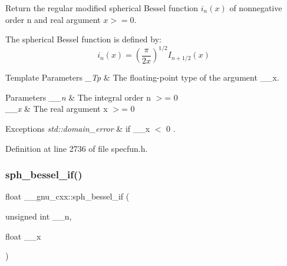 Return the regular modified spherical Bessel function $ i_n(x) $ of nonnegative order n and real argument $ x >= 0 $.

The spherical Bessel function is defined by\+: \[ i_n(x) = \left(\frac{\pi}{2x} \right) ^{1/2} I_{n+1/2}(x) \]


\begin{DoxyTemplParams}{Template Parameters}
{\em \+\_\+\+Tp} & The floating-\/point type of the argument {\ttfamily \+\_\+\+\_\+x}. \\
\hline
\end{DoxyTemplParams}

\begin{DoxyParams}{Parameters}
{\em \+\_\+\+\_\+n} & The integral order {\ttfamily  n $>$= 0 } \\
\hline
{\em \+\_\+\+\_\+x} & The real argument {\ttfamily  x $>$= 0 } \\
\hline
\end{DoxyParams}

\begin{DoxyExceptions}{Exceptions}
{\em std\+::domain\+\_\+error} & if {\ttfamily  \+\_\+\+\_\+x $<$ 0 }. \\
\hline
\end{DoxyExceptions}


Definition at line 2736 of file specfun.\+h.

\mbox{\label{group__gnu__math__spec__func_gacc6738f18c1ba19452b9dd814d11c00c}} 
\subsubsection{\texorpdfstring{sph\+\_\+bessel\+\_\+if()}{sph\_bessel\_if()}}
{\footnotesize\ttfamily float \+\_\+\+\_\+gnu\+\_\+cxx\+::sph\+\_\+bessel\+\_\+if (\begin{DoxyParamCaption}\item[{unsigned int}]{\+\_\+\+\_\+n,  }\item[{float}]{\+\_\+\+\_\+x }\end{DoxyParamCaption})\hspace{0.3cm}{\ttfamily [inline]}}


